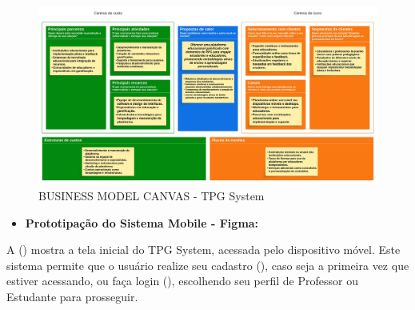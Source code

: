 \begin{figure}[!h]
\centering
\caption{BUSINESS MODEL CANVAS - TPG System}%
\label{fig:imgBMC.jpg}
\includegraphics[scale=0.3]{Illustrations/imgBMC.jpg}
\end{figure}
\pagebreak

\begin{itemize}

\item \textbf{Prototipação do Sistema Mobile - Figma:}
\\

\end{itemize}

A () mostra a tela inicial do TPG System, acessada pelo dispositivo móvel. Este sistema permite que o usuário realize seu cadastro (), caso seja a primeira vez que estiver acessando, ou faça login (), escolhendo seu perfil de Professor ou Estudante para prosseguir.
\\

